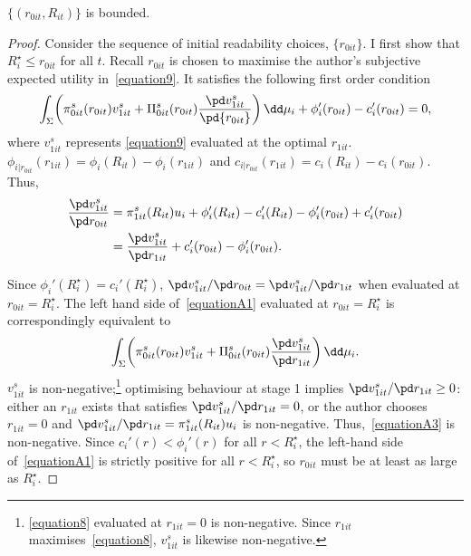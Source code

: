 \begin{lemma}\label{Lemma1}
	$\{(r_{0it}, R_{it})\}$ is bounded.
\end{lemma}
\begin{proof}
Consider the sequence of initial readability choices, $\{r_{0it}\}$. I first show that $R_i^\star\le r_{0it}$ for all $t$. Recall $r_{0it}$ is chosen to maximise the author's subjective expected utility in~\autoref{equation9}. It satisfies the following first order condition
\begin{equation}\label{equationA1}
	\int_\Sigma\!\left(\pi_{0it}^s(r_{0it})v_{1it}^s+\Pi_{0it}^s(r_{0it})\frac{\pd v_{1it}^s}{\pd{r_{0it}}}\right)\dd\mu_i+\phi_i'(r_{0it})-c_i'(r_{0it})=0,
\end{equation}
where $v_{1it}^s$ represents \autoref{equation9} evaluated at the optimal $r_{1it}$. $\phi_{i|r_{0it}}(r_{1it})=\phi_i(R_{it})-\phi_i(r_{1it})$ and $c_{i|r_{0it}}(r_{1it})=c_i(R_{it})-c_i(r_{0it})$. Thus,
\begin{align}\label{equationA2}
	\frac{\pd v_{1it}^s}{\pd r_{0it}}&=\pi_{1it}^s(R_{it})u_i+\phi_i'(R_{it})-c_i'(R_{it})-\phi_i'(r_{0it})+c_i'(r_{0it})\nonumber\\
	&=\frac{\pd v_{1it}^s}{\pd r_{1it}}+c_i'(r_{0it})-\phi_i'(r_{0it}).
\end{align}

Since $\phi_i'(R_i^\star)=c_i'(R_i^\star)$, $\pd v_{1it}^s/\pd r_{0it}=\pd v_{1it}^s/\pd r_{1it}$ when evaluated at $r_{0it}=R_i^\star$. The left hand side of~\autoref{equationA1} evaluated at $r_{0it}=R_i^\star$ is correspondingly equivalent to
\begin{equation}\label{equationA3}
	\int_\Sigma\!\left(\pi_{0it}^s(r_{0it})v_{1it}^s+\Pi_{0it}^s(r_{0it})\frac{\pd v_{1it}^s}{\pd r_{1it}}\right)\dd\mu_i.
\end{equation}
$v_{1it}^s$ is non-negative;\footnote{\autoref{equation8} evaluated at $r_{1it}=0$ is non-negative. Since $r_{1it}$ maximises~\autoref{equation8}, $v_{1it}^s$ is likewise non-negative.} optimising behaviour at stage 1 implies $\pd v_{1it}^s/\pd r_{1it}\ge0$: either an $r_{1it}$ exists that satisfies $\pd v_{1it}^s/\pd r_{1it}=0$, or the author chooses $r_{1it}=0$ and $\pd v_{1it}^s/\pd r_{1it}=\pi_{1it}^s(R_{it})u_i$ is non-negative. Thus,~\autoref{equationA3} is non-negative. Since $c_i'(r)<\phi_i'(r)$ for all $r<R_i^\star$, the left-hand side of~\autoref{equationA1} is strictly positive for all $r<R_i^\star$, so $r_{0it}$ must be at least as large as $R_i^\star$.


\end{proof}

